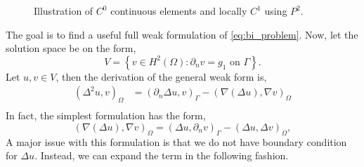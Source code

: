 \begin{figure}
\begin{minipage}[b]{0.45\textwidth}
    \caption{Illustration of $C^{0}$ continuous elements and locally $C^1$ using $P^{2}$.}
    \label{fig:C0_P2_ements}
  \end{minipage}
\end{figure}



The goal is to find a useful full weak formulation of \eqref{eq:bi_problem}. Now, let the solution space be on the form,
\begin{equation*}
V = \left\{ v \in H^2( \Omega  ) : \partial _{n} v = g_{1}    \text{ on }
\Gamma   \right\}.
\end{equation*}
Let $u,v \in  V$, then the derivation of the general weak form is,
\[
\begin{split}
\left( \Delta ^2 u,v \right) _{\Omega }  &  = \left( \partial _{n} \Delta u, v \right) _{\Gamma  } - \left( \nabla \left( \Delta  u \right) , \nabla v \right) _{\Omega }  \\
\end{split}
\]
In fact, the simplest formulation has the form,
\[
  \left( \nabla \left( \Delta u \right) , \nabla v \right) _{\Omega } =   \left( \Delta u, \partial _{n} v \right) _{\Gamma  } - \left( \Delta u, \Delta v \right)_{\Omega },
\]
A major issue with this formulation is that we do not have boundary condition for $\Delta u$. Instead, we can expand the term in the following fashion.

